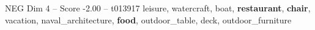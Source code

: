 \begin{textsample}{NEG Dim 4 – Score -2.00 – t013917}  \label{ex:f4_neg_008}
leisure, watercraft, boat, \textbf{restaurant}, \textbf{chair}, vacation, naval\_architecture, \textbf{food}, outdoor\_table, deck, outdoor\_furniture

\end{textsample}

